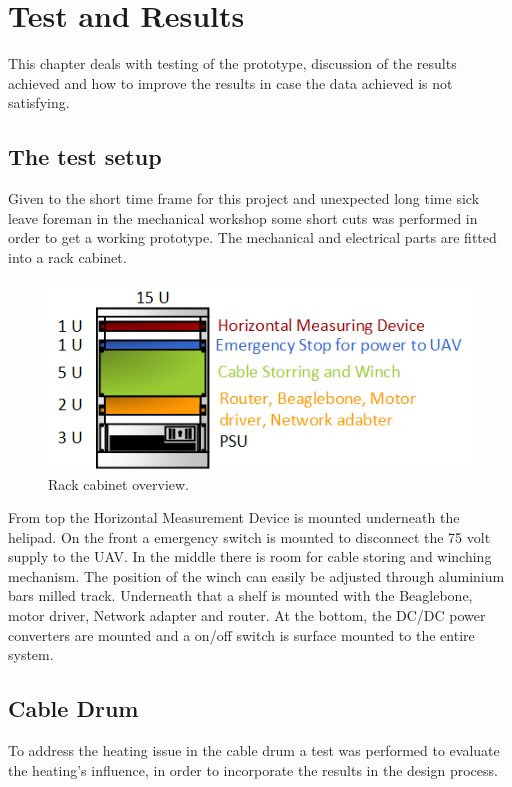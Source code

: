 
\chapter{Test and Results}
This chapter deals with testing of the prototype, discussion of the results achieved and how to improve the results in case the data achieved is not satisfying.  

\section{The test setup}
Given to the short time frame for this project and unexpected long time sick leave foreman in the mechanical workshop some short cuts was performed in order to get a working prototype. The mechanical and electrical parts are fitted into a rack cabinet.

\begin{figure}[hbtp]
  \centering
  \includegraphics[scale=1]{graphics/Visio/rack-setup.png}
  \caption{Rack cabinet overview.}
  \end{figure}   

\noindent
From top the Horizontal Measurement Device is mounted underneath the helipad. On the front a emergency switch is mounted to disconnect the 75 volt supply to the UAV. In the middle there is room for cable storing and winching mechanism. The position of the winch can easily be adjusted through aluminium bars milled track.
Underneath that a shelf is mounted with the Beaglebone, motor driver, Network adapter and router.
At the bottom, the DC/DC power converters are mounted and a on/off switch is surface mounted to the entire system.  

\section{Cable Drum}
To address the heating issue in the cable drum a test was performed to evaluate the heating’s influence, in order to incorporate the results in the design process.\\

